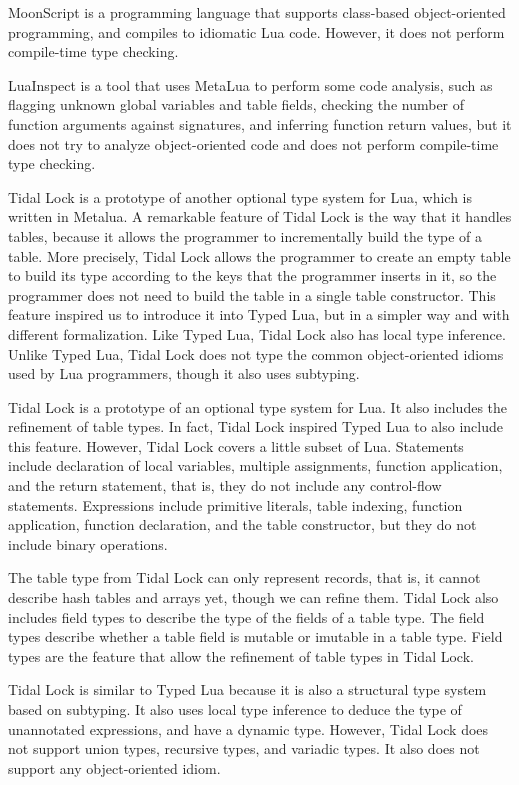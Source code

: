 MoonScript \citep{moonscript} is a programming language that supports
class-based object-oriented programming, and compiles to idiomatic
Lua code.
However, it does not perform compile-time type checking.

LuaInspect \citep{luainspect} is a tool that uses MetaLua to perform
some code analysis, such as flagging unknown global variables and
table fields, checking the number of function arguments against
signatures, and inferring function return values, but it does not
try to analyze object-oriented code and does not perform compile-time
type checking.

Tidal Lock \citep{tidallock} is a prototype of another optional type
system for Lua, which is written in Metalua.
A remarkable feature of Tidal Lock is the way that it handles tables,
because it allows the programmer to incrementally build the type of
a table.
More precisely, Tidal Lock allows the programmer to create an empty
table to build its type according to the keys that the programmer
inserts in it, so the programmer does not need to build the table in
a single table constructor.
This feature inspired us to introduce it into Typed Lua,
but in a simpler way and with different formalization.
Like Typed Lua, Tidal Lock also has local type inference.
Unlike Typed Lua, Tidal Lock does not type the common object-oriented
idioms used by Lua programmers, though it also uses subtyping.

Tidal Lock \citep{tidallock} is a prototype of an optional type system for Lua.
It also includes the refinement of table types.
In fact, Tidal Lock inspired Typed Lua to also include this feature.
However, Tidal Lock covers a little subset of Lua.
Statements include declaration of local variables, multiple assignments,
function application, and the return statement, that is, they do not
include any control-flow statements.
Expressions include primitive literals, table indexing, function application,
function declaration, and the table constructor, but they do not include
binary operations.

The table type from Tidal Lock can only represent records, that is,
it cannot describe hash tables and arrays yet, though we can refine them.
Tidal Lock also includes field types to describe the type of the fields
of a table type.
The field types describe whether a table field is mutable or imutable
in a table type.
Field types are the feature that allow the refinement of table types in
Tidal Lock.

Tidal Lock is similar to Typed Lua because it is also a structural type
system based on subtyping.
It also uses local type inference to deduce the type of unannotated expressions,
and have a dynamic type.
However, Tidal Lock does not support union types, recursive types, and variadic types.
It also does not support any object-oriented idiom.

